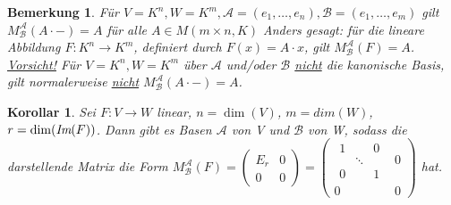 \documentclass[12pt,a4paper]{article}
\theoremstyle{plain}
\newtheorem{Korollar}[Theorem]{Korollar}
\newtheorem{Bemerkung}[Theorem]{Bemerkung}
\numberwithin{equation}{section}
\begin{document}
\begin{Bemerkung}
Für $V=K^n, W=K^m, \mathcal{A}=(e_1,\ldots,e_n), \mathcal{B}=(e_1,\ldots,e_m)$ gilt $M^\mathcal{A}_\mathcal{B}(A\cdot -)=A$ für alle $A\in M(m\times n, K)$ Anders gesagt: für die lineare Abbildung $F:K^n \rightarrow K^m$, definiert durch $F(x)=A\cdot x$, gilt $M^\mathcal{A}_\mathcal{B}(F)=A$.\\
\underline{Vorsicht!} Für $V=K^n, W=K^m$ über $\mathcal{A}$ und/oder $\mathcal{B}$ \underline{nicht} die kanonische Basis, gilt normalerweise \underline{nicht} $M^\mathcal{A}_\mathcal{B}(A\cdot -)=A$.
\end{Bemerkung}
\begin{Korollar}
Sei $F:V\rightarrow W$ linear, $n=\dim(V)$, $m=dim(W)$, $r=\dim(\emph{Im}(F))$. Dann gibt es Basen $\mathcal{A}$ von V und $\mathcal{B}$ von W, sodass die darstellende Matrix die Form $M^\mathcal{A}_\mathcal{B}(F)=\left(\begin{matrix} E_r & 0 \\ 0 & 0 \end{matrix} \right)=\left( \begin{matrix}
\begin{matrix}
1 & & 0\\
& \ddots & \\
0 & & 1 
\end{matrix} & 0 \\ 0 & 0
\end{matrix} \right)$ hat.
\end{Korollar}
\end{document}
